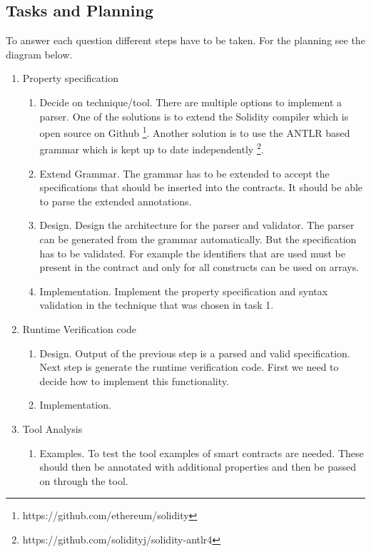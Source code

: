 \documentclass[a4paper]{article}
\begin{document}
\subsection{Tasks and Planning}
To answer each question different steps have to be taken. For the planning see the diagram below. 
\begin{enumerate}
    \item Property specification 
    \begin{enumerate}[label*=\arabic*.] 
        \item Decide on technique/tool. There are multiple options to implement a parser. One of the solutions is to extend the Solidity compiler which is open source on Github \footnote{https://github.com/ethereum/solidity}. Another solution is to use the ANTLR based grammar which is kept up to date independently \footnote{https://github.com/solidityj/solidity-antlr4}. 
        \item Extend Grammar. The grammar has to be extended to accept the specifications that should be inserted into the contracts. It should be able to parse the extended annotations.
        \item Design. Design the architecture for the parser and validator. The parser can be generated from the grammar automatically. But the specification has to be validated. For example the identifiers that are used must be present in the contract and only for all constructs can be used on arrays.
        \item Implementation. Implement the property specification and syntax validation in the technique that was chosen in task 1.
    \end{enumerate}
    \item Runtime Verification code 
    \begin{enumerate}[label*=\arabic*.] 
        \item Design. Output of the previous step is a parsed and valid specification. Next step is generate the runtime verification code. First we need to decide how to implement this functionality.
        \item Implementation.
    \end{enumerate}
    \item Tool Analysis 
    \begin{enumerate}[label*=\arabic*.] 
        \item Examples. To test the tool examples of smart contracts are needed. These should then be annotated with additional properties and then be passed on through the tool. 

\end{enumerate}
\end{enumerate}
\end{document}
